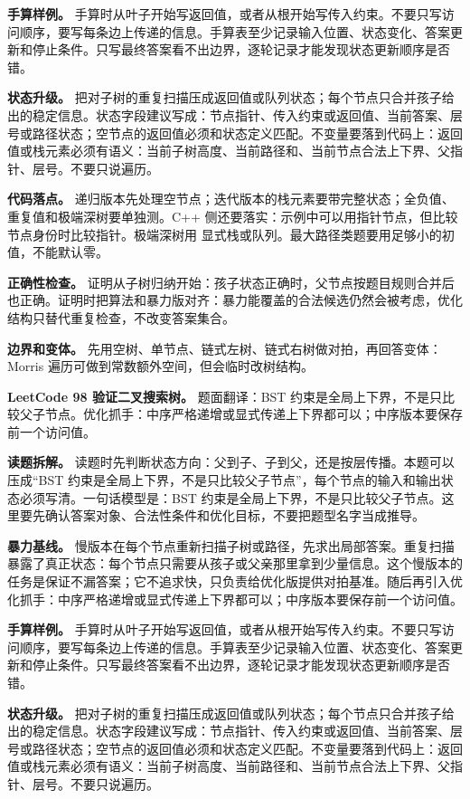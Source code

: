 \textbf{手算样例。} 手算时从叶子开始写返回值，或者从根开始写传入约束。不要只写访问顺序，要写每条边上传递的信息。手算表至少记录输入位置、状态变化、答案更新和停止条件。只写最终答案看不出边界，逐轮记录才能发现状态更新顺序是否错。

\textbf{状态升级。} 把对子树的重复扫描压成返回值或队列状态；每个节点只合并孩子给出的稳定信息。状态字段建议写成：节点指针、传入约束或返回值、当前答案、层号或路径状态；空节点的返回值必须和状态定义匹配。不变量要落到代码上：返回值或栈元素必须有语义：当前子树高度、当前路径和、当前节点合法上下界、父指针、层号。不要只说遍历。

\textbf{代码落点。} 递归版本先处理空节点；迭代版本的栈元素要带完整状态；全负值、重复值和极端深树要单独测。C++ 侧还要落实：示例中可以用指针节点，但比较节点身份时比较指针。极端深树用  显式栈或队列。最大路径类题要用足够小的初值，不能默认零。

\textbf{正确性检查。} 证明从子树归纳开始：孩子状态正确时，父节点按题目规则合并后也正确。证明时把算法和暴力版对齐：暴力能覆盖的合法候选仍然会被考虑，优化结构只替代重复检查，不改变答案集合。

\textbf{边界和变体。} 先用空树、单节点、链式左树、链式右树做对拍，再回答变体：Morris 遍历可做到常数额外空间，但会临时改树结构。

\noindent\textbf{LeetCode 98 验证二叉搜索树。} 题面翻译：BST 约束是全局上下界，不是只比较父子节点。优化抓手：中序严格递增或显式传递上下界都可以；中序版本要保存前一个访问值。

\textbf{读题拆解。} 读题时先判断状态方向：父到子、子到父，还是按层传播。本题可以压成“BST 约束是全局上下界，不是只比较父子节点”，每个节点的输入和输出状态必须写清。一句话模型是：BST 约束是全局上下界，不是只比较父子节点。这里要先确认答案对象、合法性条件和优化目标，不要把题型名字当成推导。

\textbf{暴力基线。} 慢版本在每个节点重新扫描子树或路径，先求出局部答案。重复扫描暴露了真正状态：每个节点只需要从孩子或父亲那里拿到少量信息。这个慢版本的任务是保证不漏答案；它不追求快，只负责给优化版提供对拍基准。随后再引入优化抓手：中序严格递增或显式传递上下界都可以；中序版本要保存前一个访问值。

\textbf{手算样例。} 手算时从叶子开始写返回值，或者从根开始写传入约束。不要只写访问顺序，要写每条边上传递的信息。手算表至少记录输入位置、状态变化、答案更新和停止条件。只写最终答案看不出边界，逐轮记录才能发现状态更新顺序是否错。

\textbf{状态升级。} 把对子树的重复扫描压成返回值或队列状态；每个节点只合并孩子给出的稳定信息。状态字段建议写成：节点指针、传入约束或返回值、当前答案、层号或路径状态；空节点的返回值必须和状态定义匹配。不变量要落到代码上：返回值或栈元素必须有语义：当前子树高度、当前路径和、当前节点合法上下界、父指针、层号。不要只说遍历。

